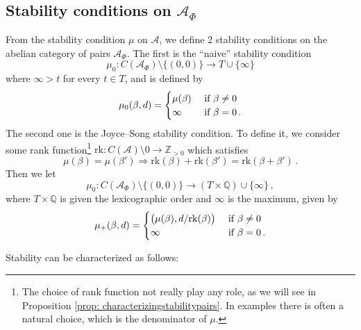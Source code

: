 \documentclass[12pt]{amsart}
\theoremstyle{definition}
\newcommand{\BQ}{{\mathbb{Q}}}
\newcommand{\BZ}{{\mathbb{Z}}}
\newcommand{\CA}{{\mathcal A}}
\newcommand{\1}{\mathbf 1}
\newcommand{\rk}{\mathrm{rk}}
\begin{document}
\subsection{Stability conditions on $\CA_\Phi$}
\label{subsec: stabilityframing}

From the stability condition $\mu$ on $\CA$, we define 2 stability conditions on the abelian category of pairs $\CA_\Phi$. The first is the ``naive'' stability condition
\[\mu_0\colon C(\CA_\Phi)\setminus \{(0,0)\}\to T\cup\{\infty\}\]
where $\infty>t$ for every $t\in T$, and is defined by
\[\mu_0(\beta, d)=\begin{cases}\mu(\beta)&\textup{ if }\beta\neq 0\\
\infty &\textup{ if }\beta=0\,.
\end{cases}\]
The second one is the Joyce--Song stability condition. To define it, we consider some rank function\footnote{The choice of rank function not really play any role, as we will see in Proposition \ref{prop: characterizingstabilitypairs}. In examples there is often a natural choice, which is the denominator of $\mu$.} $\rk\colon C(\CA)\setminus 0\to \BZ_{>0}$ which satisfies 
\[\mu(\beta)=\mu(\beta')\Rightarrow  \rk(\beta)+\rk(\beta')=\rk(\beta+\beta')\,.\]
Then we let 
\[\mu_0\colon C(\CA_\Phi)\setminus \{(0,0)\}\to (T\times \BQ)\cup\{\infty\}\,,\]
where $T\times \BQ$ is given the lexicographic order and $\infty$ is the maximum, given by
\[\mu_+(\beta, d)=\begin{cases}\big(\mu(\beta), d/\rk(\beta)\big)&\textup{ if }\beta\neq 0\\
\infty &\textup{ if }\beta=0\,.
\end{cases}\]


Stability can be characterized as follows:
\end{document}
